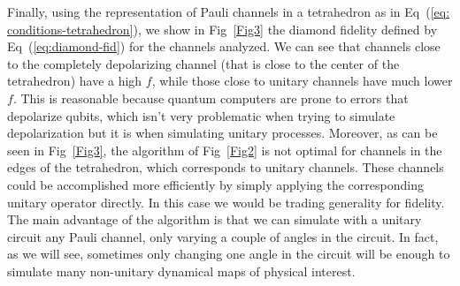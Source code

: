 \documentclass[10pt,letterpaper]{article} %
\newcommand{\fref}[1]{Fig~\ref{#1}}
\newcommand{\eref}[1]{Eq~(\ref{#1})}
\begin{document}
Finally, using the representation of Pauli channels in a tetrahedron as in
\eref{eq: conditions-tetrahedron}, we show in \fref{Fig3} the diamond
fidelity defined by \eref{eq:diamond-fid} for the channels analyzed.  We can
see that channels close to the completely depolarizing channel (that is close
to the center of the tetrahedron) have a high $f$, while those close to unitary
channels have much lower $f$. 
This is reasonable because quantum computers are
prone to errors that depolarize qubits, which isn't very problematic when
trying to simulate depolarization but it is when simulating unitary processes.
Moreover, as can be seen in \fref{Fig3}, the algorithm of \fref{Fig2} is not optimal for 
channels in the edges of the tetrahedron, which corresponds to unitary channels. 
These channels could be accomplished more
efficiently by simply applying the corresponding unitary operator directly. 
In this case we would be trading generality for fidelity. 
The main advantage of the algorithm is that we can simulate with a unitary 
circuit
any Pauli channel, 
only varying a couple of angles in the circuit.
In fact, as we will see, sometimes only changing one angle in the circuit will
be enough to simulate many non-unitary dynamical maps of physical interest. 
\end{document}
